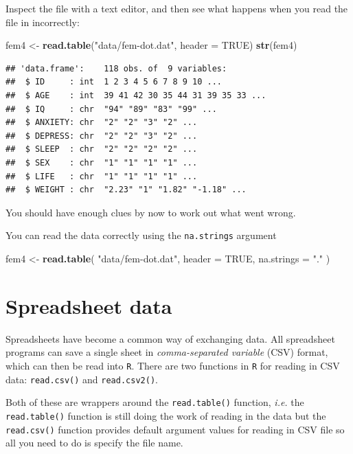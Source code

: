 \documentclass[
]{book}
\newenvironment{Shaded}{\begin{snugshade}}{\end{snugshade}}
\newcommand{\AttributeTok}[1]{\textcolor[rgb]{0.13,0.29,0.53}{#1}}
\newcommand{\ConstantTok}[1]{\textcolor[rgb]{0.56,0.35,0.01}{#1}}
\newcommand{\FunctionTok}[1]{\textcolor[rgb]{0.13,0.29,0.53}{\textbf{#1}}}
\newcommand{\NormalTok}[1]{#1}
\newcommand{\OtherTok}[1]{\textcolor[rgb]{0.56,0.35,0.01}{#1}}
\newcommand{\StringTok}[1]{\textcolor[rgb]{0.31,0.60,0.02}{#1}}
\theoremstyle{definition}
\theoremstyle{definition}
\theoremstyle{definition}
\theoremstyle{definition}
\theoremstyle{remark}
\begin{document}
Inspect the file with a text editor, and then see what happens when
you read the file in incorrectly:

\begin{Shaded}
\begin{Highlighting}[]
\NormalTok{fem4 }\OtherTok{\textless{}{-}} \FunctionTok{read.table}\NormalTok{(}\StringTok{"data/fem{-}dot.dat"}\NormalTok{, }\AttributeTok{header =} \ConstantTok{TRUE}\NormalTok{)}
\FunctionTok{str}\NormalTok{(fem4)}
\end{Highlighting}
\end{Shaded}

\begin{verbatim}
## 'data.frame':    118 obs. of  9 variables:
##  $ ID     : int  1 2 3 4 5 6 7 8 9 10 ...
##  $ AGE    : int  39 41 42 30 35 44 31 39 35 33 ...
##  $ IQ     : chr  "94" "89" "83" "99" ...
##  $ ANXIETY: chr  "2" "2" "3" "2" ...
##  $ DEPRESS: chr  "2" "2" "3" "2" ...
##  $ SLEEP  : chr  "2" "2" "2" "2" ...
##  $ SEX    : chr  "1" "1" "1" "1" ...
##  $ LIFE   : chr  "1" "1" "1" "1" ...
##  $ WEIGHT : chr  "2.23" "1" "1.82" "-1.18" ...
\end{verbatim}

You should have enough clues by now to work out what went wrong.

You can read the data correctly using the \texttt{na.strings} argument

\begin{Shaded}
\begin{Highlighting}[]
\NormalTok{fem4 }\OtherTok{\textless{}{-}} 
  \FunctionTok{read.table}\NormalTok{(}
    \StringTok{"data/fem{-}dot.dat"}\NormalTok{, }
    \AttributeTok{header =} \ConstantTok{TRUE}\NormalTok{, }
    \AttributeTok{na.strings =} \StringTok{"."}
\NormalTok{  )}
\end{Highlighting}
\end{Shaded}

\section{Spreadsheet data}\label{spreadsheet-data}

Spreadsheets have become a common way of exchanging data. All
spreadsheet programs can save a single sheet in \emph{comma-separated
variable} (CSV) format, which can then be read into \texttt{R}. There
are two functions in \texttt{R} for reading in CSV data:
\texttt{read.csv()} and \texttt{read.csv2()}.

Both of these are wrappers around the \texttt{read.table()} function,
\emph{i.e.} the \texttt{read.table()} function is still doing the work
of reading in the data but the \texttt{read.csv()} function provides
default argument values for reading in CSV file so all you need to
do is specify the file name.
\end{document}
